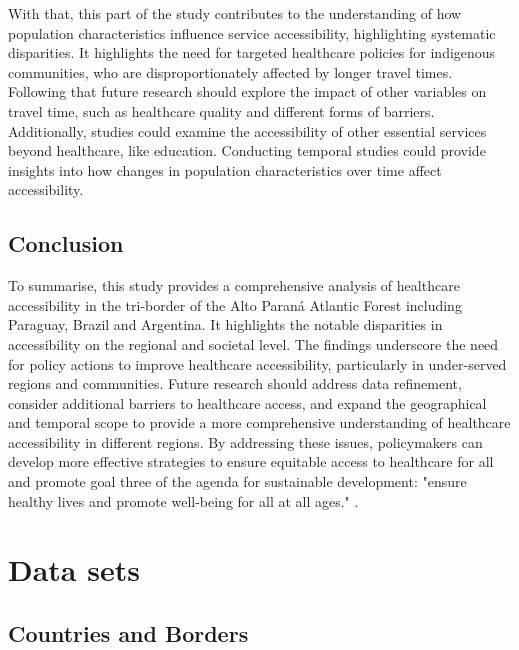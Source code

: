 \documentclass[11pt, a4paper]{report}
\begin{document}
%
With that, this part of the study contributes to the understanding of how population characteristics influence service accessibility, highlighting systematic disparities. It highlights the need for targeted healthcare policies for indigenous communities, who are disproportionately affected by longer travel times. \\
%
Following that future research should explore the impact of other variables on travel time, such as healthcare quality and different forms of barriers.
Additionally, studies could examine the accessibility of other essential services beyond healthcare, like education. Conducting temporal studies could provide insights into how changes in population characteristics over time affect accessibility. \\
%

\section{Conclusion}

To summarise, this study provides a comprehensive analysis of healthcare accessibility in the tri-border of the Alto Paraná Atlantic Forest including Paraguay, Brazil and Argentina. It highlights the notable disparities in accessibility on the regional and societal level. The findings underscore the need for policy actions to improve healthcare accessibility, particularly in under-served regions and communities. Future research should address data refinement, consider additional barriers to healthcare access, and expand the geographical and temporal scope to provide a more comprehensive understanding of healthcare accessibility in different regions. By addressing these issues, policymakers can develop more effective strategies to ensure equitable access to healthcare for all and promote goal three of the agenda for sustainable development: "ensure healthy lives and promote well-being for all at all ages." \citep{united_nations_transforming_2015}.



\appendix
\renewcommand{\thefigure}{\Alph{chapter}\arabic{figure}}
\setcounter{figure}{0}
\chapter{Data sets} \label{sec:appendix:datasets}

\section{Countries and Borders}
\end{document}
